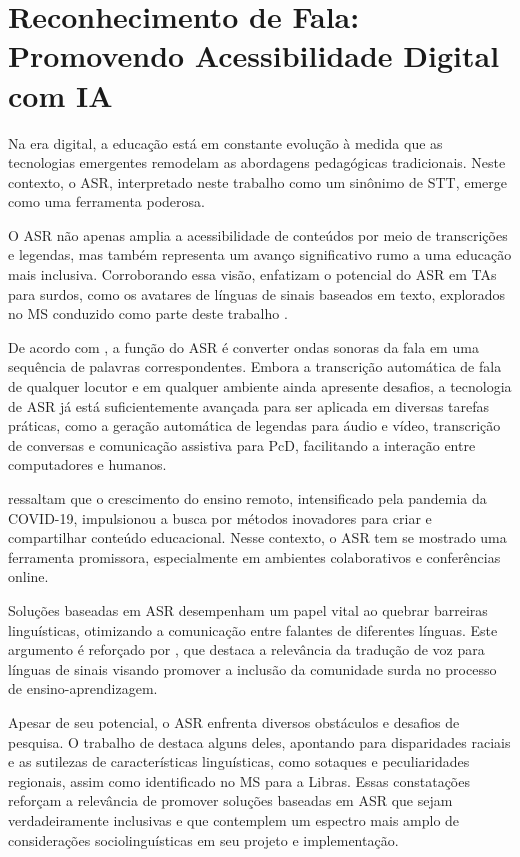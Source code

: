\section{Reconhecimento de Fala: Promovendo Acessibilidade Digital com IA}
\label{section:foundation:asr}

Na era digital, a educação está em constante evolução à medida que as tecnologias emergentes remodelam as abordagens pedagógicas tradicionais. Neste contexto, o ASR, interpretado neste trabalho como um sinônimo de STT, emerge como uma ferramenta poderosa.

O ASR não apenas amplia a acessibilidade de conteúdos por meio de transcrições e legendas, mas também representa um avanço significativo rumo a uma educação mais inclusiva. Corroborando essa visão,  enfatizam o potencial do ASR em TAs para surdos, como os avatares de línguas de sinais baseados em texto, explorados no MS conduzido como parte deste trabalho \cite{FalvoJr2020_FIE, FalvoJr2020_SBIE, FalvoJr2021_RENOTE}.

De acordo com , a função do ASR é converter ondas sonoras da fala em uma sequência de palavras correspondentes. Embora a transcrição automática de fala de qualquer locutor e em qualquer ambiente ainda apresente desafios, a tecnologia de ASR já está suficientemente avançada para ser aplicada em diversas tarefas práticas, como a geração automática de legendas para áudio e vídeo, transcrição de conversas e comunicação assistiva para PcD, facilitando a interação entre computadores e humanos.

 ressaltam que o crescimento do ensino remoto, intensificado pela pandemia da COVID-19, impulsionou a busca por métodos inovadores para criar e compartilhar conteúdo educacional. Nesse contexto, o ASR tem se mostrado uma ferramenta promissora, especialmente em ambientes colaborativos e conferências online.

Soluções baseadas em ASR desempenham um papel vital ao quebrar barreiras linguísticas, otimizando a comunicação entre falantes de diferentes línguas. Este argumento é reforçado por , que destaca a relevância da tradução de voz para línguas de sinais visando promover a inclusão da comunidade surda no processo de ensino-aprendizagem.

Apesar de seu potencial, o ASR enfrenta diversos obstáculos e desafios de pesquisa. O trabalho de  destaca alguns deles, apontando para disparidades raciais e as sutilezas de características linguísticas, como sotaques e peculiaridades regionais, assim como identificado no MS para a Libras. Essas constatações reforçam a relevância de promover soluções baseadas em ASR que sejam verdadeiramente inclusivas e que contemplem um espectro mais amplo de considerações sociolinguísticas em seu projeto e implementação.

